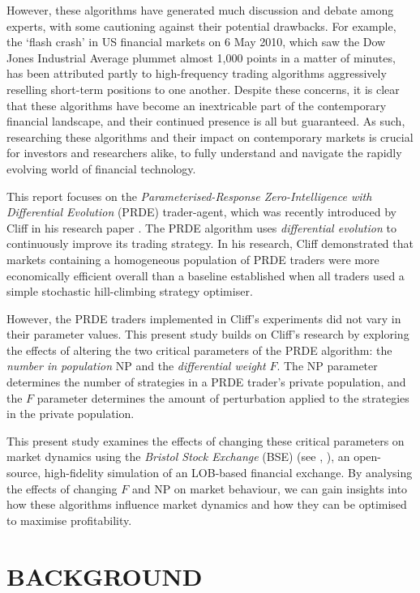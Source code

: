 \documentclass[a4paper,twoside]{article}
\begin{document}
However, these algorithms have generated much discussion and debate among experts, with some cautioning against their potential drawbacks.
For example, the `flash crash' in US financial markets on 6 May 2010, which saw the Dow Jones Industrial Average plummet almost 1,000 points in a matter of minutes, has been attributed partly to high-frequency trading algorithms aggressively reselling short-term positions to one another.
Despite these concerns, it is clear that these algorithms have become an inextricable part of the contemporary financial landscape, and their continued presence is all but guaranteed.
As such, researching these algorithms and their impact on contemporary markets is crucial for investors and researchers alike, to fully understand and navigate the rapidly evolving world of financial technology.

This report focuses on the \textit{Parameterised-Response Zero-Intelligence with Differential Evolution} (PRDE) trader-agent, which was recently introduced by Cliff in his research paper \cite{PRDE}.
The PRDE algorithm uses \textit{differential evolution} \cite{StornPrice} to continuously improve its trading strategy.
In his research, Cliff demonstrated that markets containing a homogeneous population of PRDE traders were more economically efficient overall than a baseline established when all traders used a simple stochastic hill-climbing strategy optimiser.

However, the PRDE traders implemented in Cliff's experiments did not vary in their parameter values.
This present study builds on Cliff's research by exploring the effects of altering the two critical parameters of the PRDE algorithm: the \textit{number in population} $\mathrm{NP}$ and the \textit{differential weight} $F$.
The $\mathrm{NP}$ parameter determines the number of strategies in a PRDE trader's private population, and the $F$ parameter determines the amount of perturbation applied to the strategies in the private population.

This present study examines the effects of changing these critical parameters on market dynamics using the \textit{Bristol Stock Exchange} (BSE) (see \cite{BSE}, \cite{BSEPaper}), an open-source, high-fidelity simulation of an LOB-based financial exchange.
By analysing the effects of changing $F$ and $\mathrm{NP}$ on market behaviour, we can gain insights into how these algorithms influence market dynamics and how they can be optimised to maximise profitability.

\section{\uppercase{Background}}
\end{document}
